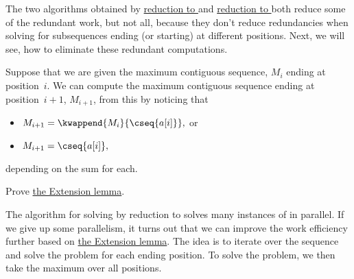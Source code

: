 \begin{gram}
The two algorithms obtained by
\href{alg:mcss::reduction::mcss-red-mcsss}{reduction to \MCSSS{}}
%
and
%
\href{alg:mcss::reduction::mcss-red-mcsse}{reduction to \MCSSE{}}
%
both reduce some of the redundant work, but not all, because they don't reduce redundancies when solving for subsequences ending (or starting) at different positions.
%
Next, we will see, how to eliminate these redundant computations.

\end{gram}

\begin{lemma}
\label{lem:mcss::reduction::mcsse-extension}
Suppose that we are given the maximum contiguous sequence, $M_{i}$
ending at position~$i$.
%
We can compute the maximum contiguous sequence ending at position~$i+1$,
$M_{i+1}$, from this by noticing that 
%
\begin{itemize}
\item $M_{i+1} = \kwappend{M_{i}}{\cseq{a[i]}},$ or 
\item $M_{i+1} = \cseq{a[i]},$
\end{itemize}
%
depending on the sum for each.
\end{lemma}

\begin{exercise}
Prove 
%
\href{lem:mcss::reduction::mcsse-extension}{the \MCSSE{} Extension lemma}.
\end{exercise}




\begin{gram}
The algorithm for solving \MCSS{} by reduction to \MCSSE{} solves many
instances of \MCSSE{} in parallel.
%
If we give up some parallelism, it turns out that we can improve the
work efficiency further based on
\href{lem:mcss::reduction::mcsse-extension}{the \MCSSE{} Extension lemma}.
%
The idea is to iterate over the sequence and solve the \MCSSE{}
problem for each ending position.
%
To solve the \MCSSE{} problem, we then take the maximum over all
positions.
%
\end{gram}

